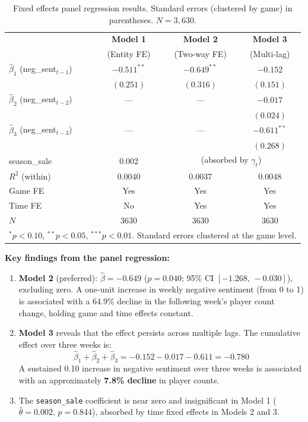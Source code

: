 \documentclass[11pt, letterpaper]{article}
\begin{document}
\begin{table}[H]
\centering
\small
\caption{Fixed effects panel regression results. Standard errors (clustered by game) in parentheses. $N = 3{,}630$.}
\label{tab:regression}
\begin{tabular}{lccc}
\toprule
& \textbf{Model 1} & \textbf{Model 2} & \textbf{Model 3} \\
& (Entity FE) & (Two-way FE) & (Multi-lag) \\
\midrule
$\hat{\beta}_1$ (neg\_sent$_{t-1}$) & $-0.511^{**}$ & $-0.649^{**}$ & $-0.152$ \\
                                      & $(0.251)$     & $(0.316)$     & $(0.151)$ \\[0.5em]
$\hat{\beta}_2$ (neg\_sent$_{t-2}$) & ---           & ---           & $-0.017$ \\
                                      &               &               & $(0.024)$ \\[0.5em]
$\hat{\beta}_3$ (neg\_sent$_{t-3}$) & ---           & ---           & $-0.611^{**}$ \\
                                      &               &               & $(0.268)$ \\[0.5em]
season\_sale                          & $0.002$       & \multicolumn{2}{c}{(absorbed by $\gamma_t$)} \\[0.3em]
\midrule
$R^2$ (within)  & 0.0040 & 0.0037 & 0.0048 \\
Game FE         & Yes    & Yes    & Yes    \\
Time FE         & No     & Yes    & Yes    \\
$N$             & 3630   & 3630   & 3630   \\
\bottomrule
\multicolumn{4}{l}{\footnotesize $^{*}p<0.10$, $^{**}p<0.05$, $^{***}p<0.01$. Standard errors clustered at the game level.}
\end{tabular}
\end{table}

\medskip\noindent\textbf{Key findings from the panel regression:}

\begin{enumerate}[nosep]
    \item \textbf{Model 2} (preferred): $\hat{\beta} = -0.649$ ($p = 0.040$; 95\% CI $[-1.268,\,-0.030]$), excluding zero.
    A one-unit increase in weekly negative sentiment (from 0 to 1) is associated with a 64.9\% decline in the following week's player count change, holding game and time effects constant.
    \item \textbf{Model 3} reveals that the effect persists across multiple lags.
    The cumulative effect over three weeks is:
    \[
        \hat{\beta}_1 + \hat{\beta}_2 + \hat{\beta}_3 = -0.152 - 0.017 - 0.611 = -0.780
    \]
    A sustained 0.10 increase in negative sentiment over three weeks is associated with an approximately \textbf{7.8\% decline} in player counts.
    \item The \texttt{season\_sale} coefficient is near zero and insignificant in Model 1 ($\hat{\theta} = 0.002$, $p = 0.844$), absorbed by time fixed effects in Models 2 and 3.
\end{enumerate}
\end{document}
